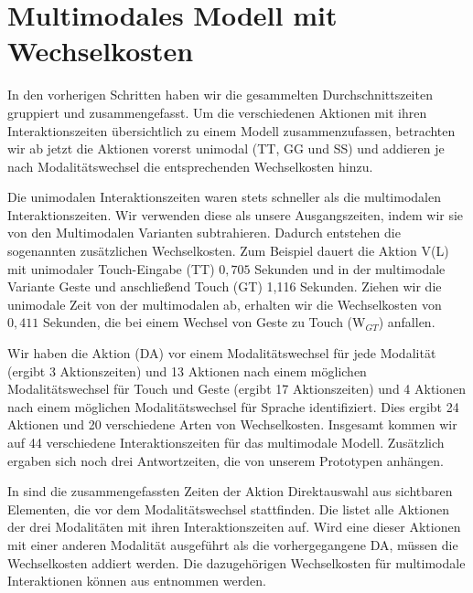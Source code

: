 \section[Multimodales Modell]{Multimodales Modell mit Wechselkosten}
In den vorherigen Schritten haben wir die gesammelten Durchschnittszeiten gruppiert und zusammengefasst.
Um die verschiedenen Aktionen mit ihren Interaktionszeiten übersichtlich zu einem Modell zusammenzufassen, betrachten wir ab jetzt die Aktionen vorerst unimodal (TT, GG und SS) und addieren je nach Modalitätswechsel die entsprechenden Wechselkosten hinzu.

Die unimodalen Interaktionszeiten waren stets schneller als die multimodalen Interaktionszeiten.
Wir verwenden diese als unsere Ausgangszeiten, indem wir sie von den Multimodalen Varianten subtrahieren.
Dadurch entstehen die sogenannten zusätzlichen Wechselkosten.
Zum Beispiel dauert die Aktion V(L) mit unimodaler Touch-Eingabe (TT) $0,705$ Sekunden und in der multimodale Variante Geste und anschließend Touch (GT) 1,116 Sekunden.
Ziehen wir die unimodale Zeit von der multimodalen ab, erhalten wir die Wechselkosten von $0,411$ Sekunden, die bei einem Wechsel von Geste zu Touch (W$_{GT}$) anfallen.

Wir haben die Aktion (DA) vor einem Modalitätswechsel für jede Modalität (ergibt 3 Aktionszeiten) und 13 Aktionen nach einem möglichen Modalitätswechsel für Touch und Geste (ergibt 17 Aktionszeiten) und 4 Aktionen nach einem möglichen Modalitätswechsel für Sprache identifiziert.
Dies ergibt 24 Aktionen und 20 verschiedene Arten von Wechselkosten.
Insgesamt kommen wir auf 44 verschiedene Interaktionszeiten für das multimodale Modell. Zusätzlich ergaben sich noch drei Antwortzeiten, die von unserem Prototypen anhängen.

In  sind die zusammengefassten Zeiten der Aktion Direktauswahl aus sichtbaren Elementen, die vor dem Modalitätswechsel stattfinden. 
Die  listet alle Aktionen der drei Modalitäten mit ihren Interaktionszeiten auf.
Wird eine dieser Aktionen mit einer anderen Modalität ausgeführt als die vorhergegangene DA, müssen die Wechselkosten addiert werden.
Die dazugehörigen Wechselkosten für multimodale Interaktionen können aus  entnommen werden.

